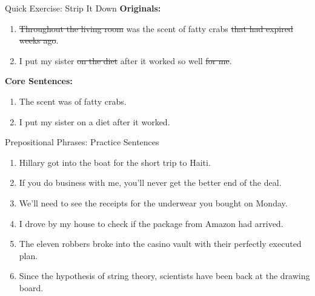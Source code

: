 \documentclass[aspectratio=169,11pt]{beamer}
\begin{document}
\begin{frame}{Quick Exercise: Strip It Down}
\small
\textbf{Originals:}
\begin{enumerate}
  \item \sout{Throughout the living room} was the scent of fatty crabs \sout{that had expired weeks ago}.
  \item I put my sister \sout{on the diet} after it worked so well \sout{for me}.
\end{enumerate}

\vspace{0.8em}
\textbf{Core Sentences:}
\begin{enumerate}
  \item The scent was of fatty crabs.
  \item I put my sister on a diet after it worked.
\end{enumerate}
\end{frame}

\begin{frame}{Prepositional Phrases: Practice Sentences}
\small
\begin{enumerate}
  \item Hillary got into the boat for the short trip to Haiti.
  \item If you do business with me, you’ll never get the better end of the deal.
  \item We’ll need to see the receipts for the underwear you bought on Monday.
  \item I drove by my house to check if the package from Amazon had arrived.
  \item The eleven robbers broke into the casino vault with their perfectly executed plan.
  \item Since the hypothesis of string theory, scientists have been back at the drawing board.
\end{enumerate}
\end{frame}
\end{document}
